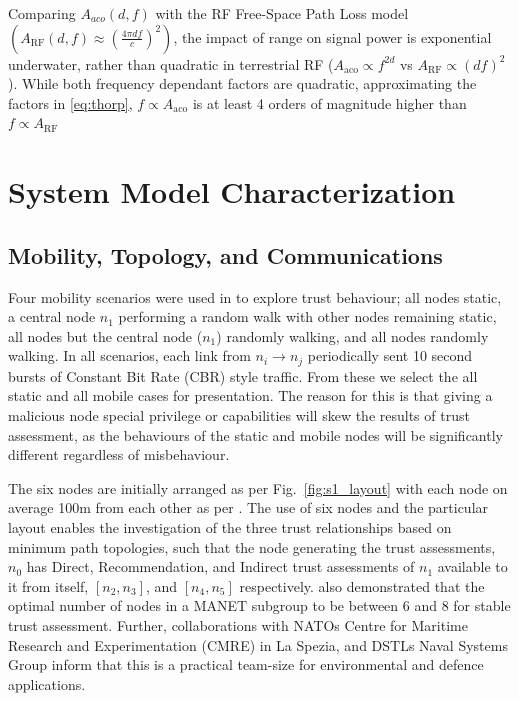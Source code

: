 \documentclass[conference]{IEEEtran}
\begin{document}
Comparing $A_{aco}(d,f)$ with the RF Free-Space Path Loss model $(A_{\text{RF}}(d,f) \approx \left( \frac{4\pi d f}{c} \right)^2)$, the impact of range on signal power is exponential underwater, rather than quadratic in terrestrial RF ($A_{\text{aco}} \propto f^{2d}$ vs $A_{\text{RF}} \propto (df)^2$). 
While both frequency dependant factors are quadratic, approximating the factors in \eqref{eq:thorp}, $f\propto A_{\text{aco}}$ is at least 4 orders of magnitude higher than $f\propto A_{\text{RF}}$



\section{System Model Characterization}\label{sec:initialsystemcharacterization}


\subsection{Mobility, Topology, and Communications}

Four mobility scenarios were used in \cite{Guo11} to explore trust behaviour; all nodes static, a central node $n_1$ performing a random walk with other nodes remaining static, all nodes but the central node ($n_1$) randomly walking, and all nodes randomly walking. 
In all scenarios, each link from $n_i \rightarrow n_j$ periodically sent 10 second bursts of Constant Bit Rate (CBR) style traffic.
From these we select the all static and all mobile cases for presentation.
The reason for this is that giving a malicious node special privilege or capabilities will skew the results of trust assessment, as the behaviours of the static and mobile nodes will be significantly different regardless of misbehaviour.

The six nodes are initially arranged as per Fig.~\ref{fig:s1_layout} with each node on average 100m from each other as per \cite{Guo11}.
The use of six nodes and the particular layout enables the investigation of the three trust relationships based on minimum path topologies, such that the node generating the trust assessments, $n_0$ has Direct, Recommendation, and Indirect trust assessments of $n_1$ available to it from itself, $[n_2,n_3]$, and $[n_4,n_5]$ respectively. 
\cite{Guo11} also demonstrated that the optimal number of nodes in a MANET subgroup to be between 6 and 8 for stable trust assessment. 
Further, collaborations with NATOs Centre for Maritime Research and Experimentation (CMRE) in La Spezia, and DSTLs Naval Systems Group inform that this is a practical team-size for environmental and defence applications.
\end{document}
